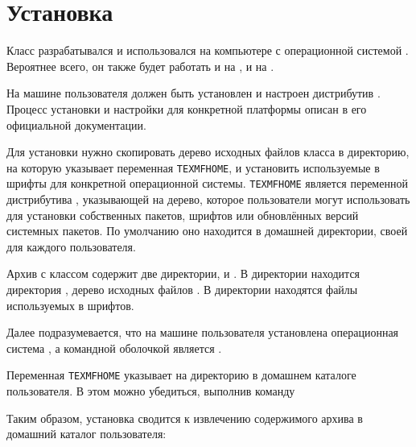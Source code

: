 
\section{Установка}

Класс  разрабатывался и использовался на компьютере с операционной
системой . Вероятнее всего, он также будет работать и на
, и на .

На машине пользователя  должен быть установлен и настроен
дистрибутив . Процесс установки и настройки 
для конкретной платформы описан в его официальной документации.

Для установки  нужно скопировать дерево исходных файлов класса в
директорию, на которую указывает переменная \texttt{TEXMFHOME}, и установить
используемые в  шрифты для конкретной операционной системы.
\texttt{TEXMFHOME} является переменной дистрибутива ,
указывающей на дерево, которое пользователи  могут использовать
для установки собственных пакетов, шрифтов или обновлённых версий системных
пакетов. По умолчанию оно находится в домашней директории, своей для каждого
пользователя.

Архив с классом  содержит две директории,  и
. В директории  находится директория , дерево
исходных файлов . В директории  находятся файлы
используемых в  шрифтов.

Далее подразумевается, что на машине пользователя установлена операционная
система , а командной оболочкой является .

Переменная \texttt{TEXMFHOME} указывает на директорию  в домашнем
каталоге пользователя. В этом можно убедиться, выполнив команду


Таким образом, установка  сводится к извлечению содержимого архива
в домашний каталог пользователя:


